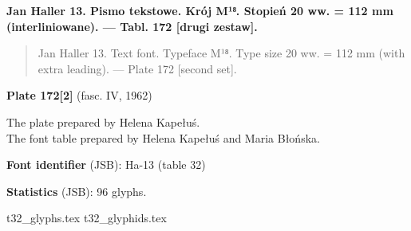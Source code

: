 \documentclass[12pt]{article}
\newcommand{\bg}{\begingl}
\newcommand{\pismoPL}[1]{{\relsize{2}\Junicode\textbf{#1}}}
\newcommand{\pismoEN}[1]{{\relsize{1}\Junicode\begin{quote}#1\end{quote}}}
\newcommand{\plate}[3]{\textbf{Plate #1} (fasc. #2, #3)}
\newcommand{\exampleDig}[1]{{\relsize{0}\Junicode \textbf{Digitization(s) [JSB]:} #1}}
\newcommand{\examplePL}[1]{}
\newcommand{\exampleEN}[1]{}
\newcommand{\fontID}[2]{{\relsize{1}\Junicode\textbf{Font identifier} (JSB): #1 (table #2)}}
\newcommand{\fontstat}[1]{{\relsize{1}\Junicode\textbf{Statistics} (JSB): #1 glyphs.}}
\newcommand{\exampleRef}[1]{{\relsize{0}\Junicode \textbf{References:} #1}}
\begin{document}







  

 \newpage



  \pismoPL{Jan Haller 13.  Pismo tekstowe. Krój M¹⁸. Stopień 20 ww. = 112 mm (interliniowane). — Tabl. 172 [drugi zestaw].}
  
  \pismoEN{Jan Haller 13. Text font. Typeface M¹⁸. Type size 20 ww. =
    112 mm (with extra leading). — Plate 172 [second set].}

\plate{172[2]}{IV}{1962}

The plate prepared by Helena Kapełuś.\\
The font table prepared by Helena Kapełuś and Maria Błońska.


\examplePL{Pismo 13: drugi zestaw. — Cyfry 9: z pismem 13.}

    \medskip

    \exampleEN{Font 13. — second character set,  — Digits 9: with font 13.}


\bigskip


\fontID{Ha-13}{32}

\fontstat{96}

  {t32_glyphs.tex}
  {t32_glyphids.tex}

  
\end{document}

